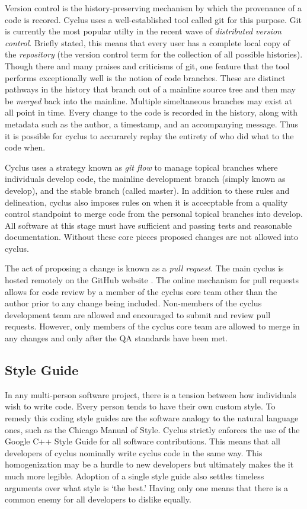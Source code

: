 Version control is the history-preserving mechanism by which the provenance of 
a code is recored. Cyclus uses a well-established tool called git 
\cite{software_freedom_conservancy_git_2014}
for this purpose. Git is currently the most popular utilty in the recent wave
of \emph{distributed version control}. Briefly stated, this means that every 
user has a complete local copy of the \emph{repository} (the version control
term for the collection of all possible histories).
Though there and many praises and criticisms of git, one 
feature that the tool performs exceptionally well is the notion of code branches.
These are distinct pathways in the history that branch out of a mainline source
tree and then may be \emph{merged} back into the mainline. Multiple simeltaneous
branches may exist at all point in time. Every change to the code is recorded
in the history, along with metadata such as the author, a timestamp, and an 
accompanying message. Thus 
it is possible for cyclus to accurarely replay the entirety of who did what to the
code when.

Cyclus uses a strategy known as \emph{git flow} 
\cite{kalliamvakou_code-centric_2014} 
to manage topical branches where individuals develop code, the mainline development
branch (simply known as develop), and the stable branch (called master).
In addition to these rules and delineation, cyclus also imposes rules on 
when it is accecptable from a quality control standpoint to merge code from 
the personal topical branches into develop. All software at this stage 
must have sufficient and passing tests and reasonable documentation. Without
these core pieces proposed changes are not allowed into cyclus.

The act of proposing a change is known as a \emph{pull request}. The main cyclus is 
hosted remotely on the GitHub website \cite{dabbish_social_2012}. The online
mechanism for pull requests allows for code review by a member of the cyclus 
core team other than the author prior to any change being included. Non-members
of the cyclus development team are allowed and encouraged to submit and review 
pull requests. However, only members of the cyclus core team are allowed to 
merge in any changes and only after the QA standards have been met.

\subsection{Style Guide}

In any multi-person software project, there is a tension between how individuals
wish to write code. Every person tends to have their own custom style. To remedy this
coding style guides are the software analogy to the natural language ones, 
such as the Chicago Manual of Style. Cyclus strictly enforces the use of the 
Google C++ Style Guide \cite{weinberger_google_2008} for all software contributions.
This means that all developers of cyclus nominally write cyclus code in the same 
way.  This homogenization may be a hurdle to new developers but ultimately 
makes the it much more legible. Adoption of a single style guide also settles
timeless arguments over what style is `the best.' Having only one means that 
there is a common enemy for all developers to dislike equally.

